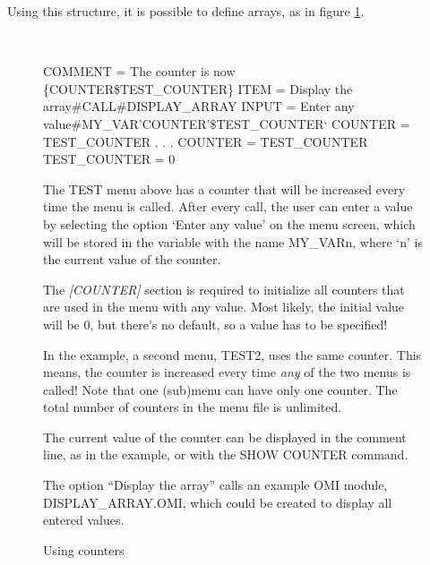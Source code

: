 \documentclass[a4paper]{book}
\renewcommand{\indent}{\hspace*{5mm}}
\begin{document}
Using this structure, it is possible to define arrays, as in figure \ref{fig:counter}.

\begin{figure}[h!tb]
\begin{minipage}[h!tb]{\textwidth}
\hrulefill \\
\begin{ttfamily}
 \newline
\indent COMMENT = The counter is now {\{}COUNTER{\$}TEST{\_}COUNTER{\}} \newline
\indent ITEM = Display the array{\#}CALL{\#}DISPLAY{\_}ARRAY \newline
\indent INPUT = Enter any value{\#}MY{\_}VAR'COUNTER'{\$}TEST{\_}COUNTER` \newline
\indent COUNTER = TEST{\_}COUNTER \newline
 \newline
{} \newline
\indent . \newline
\indent . \newline
\indent . \newline
\indent COUNTER = TEST{\_}COUNTER \newline
 \newline
\noindent[COUNTER] \newline
\indent TEST{\_}COUNTER = 0 \newline
\end{ttfamily}

\noindent The TEST menu above has a counter that will be increased every time the menu 
is called. After every call, the user can enter a value by selecting the 
option `Enter any value' on the menu screen, which will be stored in the 
variable with the name MY{\_}VARn, where `n' is the current value of the 
counter.

The \textsl{[COUNTER]} section is required to initialize all counters that are used in the 
menu with any value. Most likely, the initial value will be 0, but there's 
no default, so a value has to be specified!

In the example, a second menu, TEST2, uses the same counter. This means, the 
counter is increased every time \textit{any} of the two menus is called! Note that 
one (sub)menu can have only one counter. The total number of counters in the 
menu file is unlimited.

The current value of the counter can be displayed in the comment line, as in 
the example, or with the \textsf{SHOW COUNTER} 
command.

The option ``Display the array'' calls an example OMI module, 
DISPLAY{\_}ARRAY.OMI, which could be created to display all entered values.
\caption{Using counters}\label{fig:counter}
\hrulefill
\end{minipage}
\end{figure}
\end{document}
